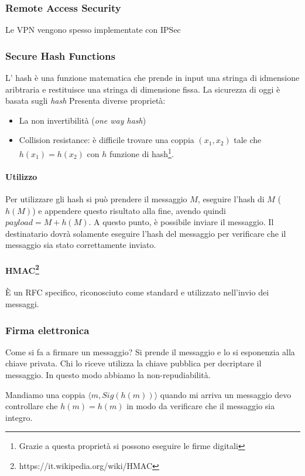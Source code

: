 \documentclass{book}
\begin{document}
\subsubsection{Remote Access Security}

Le VPN vengono spesso implementate con IPSec 

\subsubsection{Secure Hash Functions}

L' hash è una funzione matematica che prende in input una stringa di idmensione aribtraria e restituisce una stringa di dimensione fissa. La sicurezza di oggi è basata sugli \textit{hash} Presenta diverse proprietà:
\begin{itemize}
\item La non invertibilità (\emph{one way hash})
\item Collision resistance: è difficile trovare una coppia $(x_1,x_2)$ tale che $h(x_1) = h(x_2)$ con $h$ funzione di hash\footnote{Grazie a questa proprietà si possono eseguire le firme digitali}.
\end{itemize}

\paragraph*{Utilizzo}

Per utilizzare gli hash si può prendere il messaggio $M$, eseguire l'hash di $M$ ($h(M)$) e appendere questo risultato alla fine, avendo quindi $payload = M + h(M)$. A questo punto, è possibile inviare il messaggio. Il destinatario dovrà solamente eseguire l'hash del messaggio per verificare che il messaggio sia stato correttamente inviato.

\paragraph*{HMAC\footnote{https://it.wikipedia.org/wiki/HMAC}}

È un RFC specifico, riconosciuto come standard e utilizzato nell'invio dei messaggi.


\subsubsection{Firma elettronica}

Come si fa a firmare un messaggio? Si prende il messaggio e lo si esponenzia alla chiave privata. Chi lo riceve utilizza la chiave pubblica per decriptare il messaggio. In questo modo abbiamo la non-repudiabilità.

Mandiamo una coppia $ \langle m, Sig(h(m)) \rangle $ quando mi arriva un messaggio devo controllare che
$h(m) = h(m)$ in modo da verificare che il messaggio sia integro.
\end{document}
